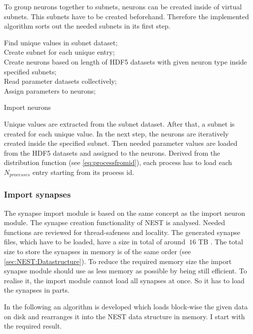 To group neurons together to subnets, neurons can be created inside of virtual subnets.
This subnets have to be created beforehand.
Therefore the implemented algorithm sorts out the needed subnets in its first step.
\begin{algorithm}[ht!]
 Find unique values in subnet dataset; \\
 Create subnet for each unique entry; \\
 Create neurons based on length of HDF5 datasets with given neuron type inside specified subnets; \\
 Read parameter datasets collectively; \\
 Assign parameters to neurons;
\label{alg2}
\caption{Import neurons}
\end{algorithm}
Unique values are extracted from the subnet dataset.
After that, a subnet is created for each unique value. 
In the next step, the neurons are iteratively created inside the specified subnet.
Then needed parameter values are loaded from the HDF5 datasets and assigned to the neurons.
Derived from the distribution function (see \ref{eq:processfromid}), each process has to load each $N_{processes}$
entry starting from its process id.

\newpage
\subsubsection{Import synapses}
The synapse import module is based on the same concept as the import neuron module.
The synapse creation functionality of NEST is analysed.
Needed functions are reviewed for thread-safeness and locality.
The generated synapse files, which have to be loaded, have a size in total of around $~16$ TB .
The total size to store the synapses in memory is of the same order (see \ref{sec:NEST:Datastructure}).
To reduce the required memory size the import synapse module should use as less memory
as possible by being still efficient.
To realise it, the import module cannot load all synapses at once.
So it has to load the synapses in parts.

In the following an algorithm is developed which loads block-wise the given data on disk and rearranges it into
the NEST data structure in memory. I start with the required result.

